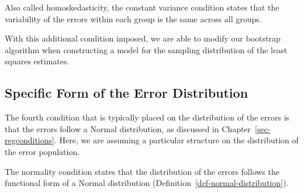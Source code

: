 \documentclass[
  letterpaper,
  DIV=11,
  numbers=noendperiod]{scrreprt}
\theoremstyle{definition}
\theoremstyle{definition}
\theoremstyle{plain}
\theoremstyle{remark}
\begin{document}
\begin{tcolorbox}[enhanced jigsaw, colbacktitle=quarto-callout-note-color!10!white, colback=white, left=2mm, title=\textcolor{quarto-callout-note-color}{\faInfo}\hspace{0.5em}{Constant Variance}, toptitle=1mm, leftrule=.75mm, breakable, bottomrule=.15mm, arc=.35mm, rightrule=.15mm, toprule=.15mm, coltitle=black, opacityback=0, colframe=quarto-callout-note-color-frame, opacitybacktitle=0.6, bottomtitle=1mm, titlerule=0mm]

Also called homoskedasticity, the constant variance condition states
that the variability of the errors within each group is the same across
all groups.

\end{tcolorbox}

With this additional condition imposed, we are able to modify our
bootstrap algorithm when constructing a model for the sampling
distribution of the least squares estimates.

\subsection{Specific Form of the Error
Distribution}\label{specific-form-of-the-error-distribution-2}

The fourth condition that is typically placed on the distribution of the
errors is that the errors follow a Normal distribution, as discussed in
Chapter~\ref{sec-regconditions}. Here, we are assuming a particular
structure on the distribution of the error population.

\begin{tcolorbox}[enhanced jigsaw, colbacktitle=quarto-callout-note-color!10!white, colback=white, left=2mm, title=\textcolor{quarto-callout-note-color}{\faInfo}\hspace{0.5em}{Normality}, toptitle=1mm, leftrule=.75mm, breakable, bottomrule=.15mm, arc=.35mm, rightrule=.15mm, toprule=.15mm, coltitle=black, opacityback=0, colframe=quarto-callout-note-color-frame, opacitybacktitle=0.6, bottomtitle=1mm, titlerule=0mm]

The normality condition states that the distribution of the errors
follows the functional form of a Normal distribution
(Definition~\ref{def-normal-distribution}).

\end{tcolorbox}
\end{document}

